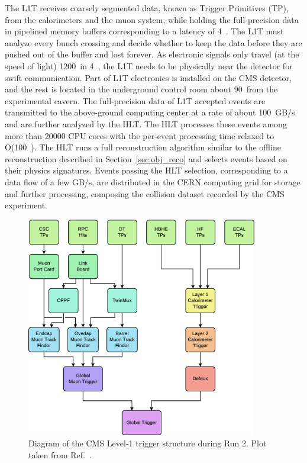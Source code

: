 The L1T receives coarsely segmented data, known as Trigger Primitives (TP), from the calorimeters and the muon system, 
while holding the full-precision data in pipelined memory buffers corresponding to a latency of 4~\mus.
The L1T must analyze every bunch crossing and decide whether to keep the data before they are pushed out of the buffer and lost forever.
As electronic signals only travel (at the speed of light) 1200~\meter in 4~\mus, the L1T needs to be physically near the detector for swift communication.
Part of L1T electronics is installed on the CMS detector, and the rest is located in the underground control room about 90~\meter from the experimental cavern.
The full-precision data of L1T accepted events are transmitted to the above-ground computing center at a rate of about 100~GB/s and are further analyzed by the HLT. 
The HLT processes these events among more than 20000 CPU cores with the per-event processing time relaxed to O(100~\ms).
The HLT runs a full reconstruction algorithm similar to the offline reconstruction described in Section~\ref{sec:obj_reco}
and selects events based on their physics signatures. 
Events passing the HLT selection, corresponding to a data flow of a few GB/s, 
are distributed in the CERN computing grid for storage and further processing,
composing the collision dataset recorded by the CMS experiment. 

\begin{figure}[!htb]
    \centering
    \captionsetup{justification=justified}
    \includegraphics[width=0.90\textwidth]{pics/LHC_CMS/L1T.png}
    \caption{Diagram of the CMS Level-1 trigger structure during Run 2.
             Plot taken from Ref.~\cite{l1t_perform}.}
    \label{fig:cms_l1t}
\end{figure}

